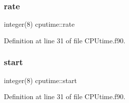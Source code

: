\mbox{\label{namespacecputime_a7648112eab2c70c19434f100a9599633}} 
\subsubsection{\texorpdfstring{rate}{rate}}
{\footnotesize\ttfamily integer(8) cputime\+::rate\hspace{0.3cm}{\ttfamily [private]}}



Definition at line 31 of file C\+P\+Utime.\+f90.

\mbox{\label{namespacecputime_a3c944d7fc4487f41daf6348bf28b1598}} 
\subsubsection{\texorpdfstring{start}{start}}
{\footnotesize\ttfamily integer(8) cputime\+::start\hspace{0.3cm}{\ttfamily [private]}}



Definition at line 31 of file C\+P\+Utime.\+f90.

